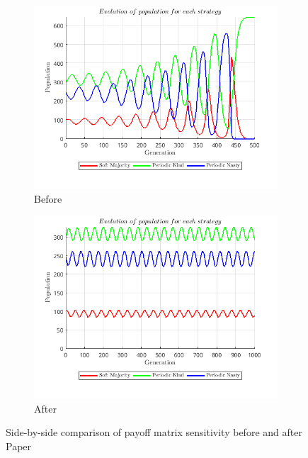 \documentclass[12pt]{report}
\begin{document}
\begin{figure}[H]
    \centering
    \begin{subfigure}[t]{0.45\textwidth}
        \centering
        \includegraphics[width=\textwidth]{payoff_matrix_sensitivity_before_paper.png}
        \caption{Before}
    \end{subfigure}
    \hfill
    \begin{subfigure}[t]{0.45\textwidth}
        \centering
        \includegraphics[width=\textwidth]{payoff_matrix_sensitivity_after_paper.png}
        \caption{After}
    \end{subfigure}
    \caption{Side-by-side comparison of payoff matrix sensitivity before and after Paper}
\end{figure}
\end{document}
